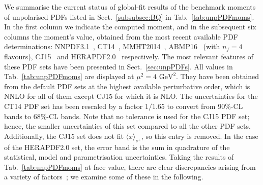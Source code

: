 We summarise the current status of global-fit results of the benchmark
moments of unpolarised PDFs listed in Sect.~\ref{subsubsec:BQ} 
in Tab.~\ref{tab:unpPDFmoms}.
%
In the first column we indicate the computed moment, and in the subsequent 
six columns the moment's value, obtained from the most recent available PDF 
determinations: NNPDF3.1~\cite{Ball:2017nwa},
CT14~\cite{Dulat:2015mca}, MMHT2014~\cite{Harland-Lang:2014zoa},
ABMP16~\cite{Alekhin:2017kpj} (with $n_f=4$ flavours), 
CJ15~\cite{Accardi:2016qay} and 
HERAPDF2.0~\cite{Abramowicz:2015mha} respectively.
%
The most relevant features of these PDF sets have been presented in 
Sect.~\ref{sec:unpPDFs}.
%
All values in Tab.~\ref{tab:unpPDFmoms} are displayed
at $\mu^2=4\mbox{ GeV}^2$. 
%
They have been obtained from the default PDF sets at the highest available 
perturbative order, which is NNLO for all of them except CJ15
for which it is NLO.
%
%
The uncertainties for the CT14 PDF set has been rescaled by a factor $1/1.65$ to 
convert from  90\%-CL bands to  68\%-CL bands.
%
Note that no tolerance is used for the CJ15 PDF set; hence, the 
smaller uncertainties of this set compared to all the other PDF sets.
Additionally, the CJ15 set does  not fit $\langle x \rangle_{s^+}$, 
so this entry is removed. 
%
In the case of the HERAPDF2.0 set, the error band is the sum in quadrature 
of the statistical, model and parametrisation uncertainties.
%
Taking the results of Tab.~\ref{tab:unpPDFmoms} at face value,
there are clear discrepancies arising from a variety of factors~\cite{Butterworth:2015oua,Accardi:2016ndt};
we examine some of these in the following. 



